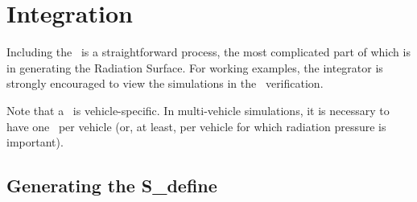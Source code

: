 %
%
%

 \section{Integration}

Including the \RadiationPressureDesc\ is a straightforward process, the most
complicated part of which is in generating the Radiation Surface.  For working
examples, the integrator is strongly encouraged to view the simulations in the
\RadiationPressureDesc\ verification.

Note that a \RadiationPressureDesc\ is vehicle-specific.  In multi-vehicle
simulations, it is necessary to have one \RadiationPressureDesc\ per vehicle
(or, at least, per vehicle for which radiation pressure is important).

\subsection{Generating the S\_define}

